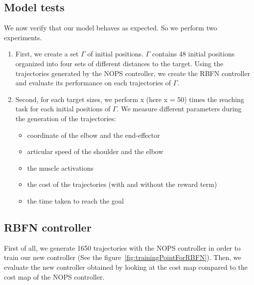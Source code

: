 \documentclass[pdftex,a4paper,12pt]{report}
\begin{document}
\subsection{Model tests}
We now verify that our model behaves as expected. So we perform two experiments.
\begin{enumerate}
\item First, we create a set $\Gamma$ of initial positions. $\Gamma$ contains 48 initial positions organized into four sets of different distances to the target.
Using the trajectories generated by the NOPS controller, we create the RBFN controller and evaluate its performance on each trajectories of $\Gamma$.
\item Second, for each target sizes, we perform x (here x = 50) times the reaching task for each initial positions of $\Gamma$. We measure different parameters during the generation of the trajectories:
\begin{itemize}
\item coordinate of the elbow and the end-effector
\item articular speed of the shoulder and the elbow
\item the muscle activations
\item the cost of the trajectories (with and without the reward term)
\item the time taken to reach the goal
\end{itemize}
\end{enumerate}

\subsection{RBFN controller}
First of all, we generate 1650 trajectories with the NOPS controller in order to train our new controller (See the figure~\ref{fig:trainingPointForRBFN}).
Then, we evaluate the new controller obtained by looking at the cost map compared to the cost map of the NOPS controller.
\end{document}

